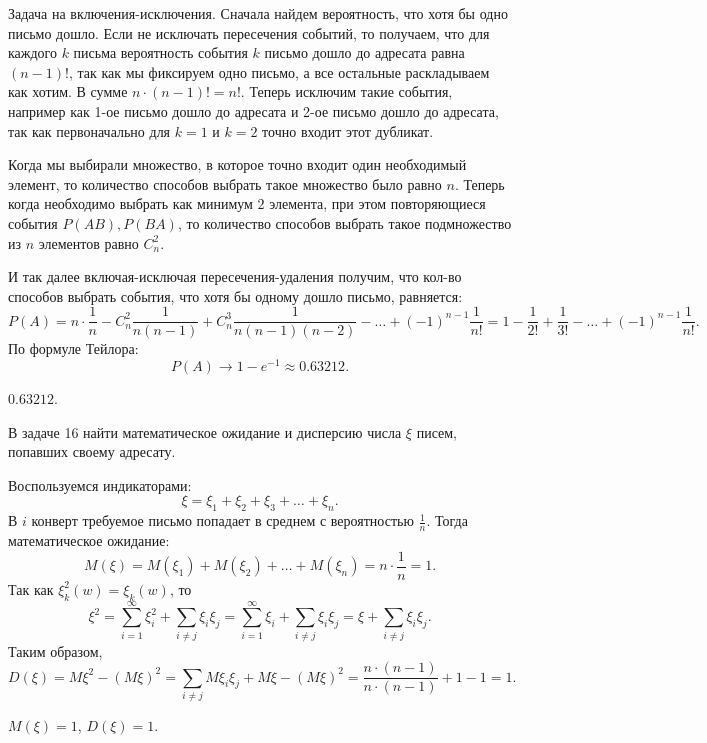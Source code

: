 \begin{solution}
Задача на включения-исключения. Сначала найдем вероятность, что хотя бы одно письмо дошло. Если не
исключать пересечения событий, то получаем, что для каждого $k$ письма вероятность события $k$
письмо дошло до адресата равна $(n - 1)!$, так как мы фиксируем одно письмо, а все остальные
раскладываем как хотим. В сумме $n \cdot (n - 1)! = n!$. Теперь исключим такие события, например как
1-ое письмо дошло до адресата и 2-ое письмо дошло до адресата, так как первоначально для $k = 1$ и 
$k = 2$ точно входит этот дубликат.

Когда мы выбирали множество, в которое точно входит один необходимый элемент, то количество способов
выбрать такое множество было равно $n$. Теперь когда необходимо выбрать как минимум $2$ элемента,
при этом повторяющиеся события $P(AB), P(BA)$, то
количество способов выбрать такое подмножество из $n$ элементов равно $C_n^2$.

И так далее включая-исключая пересечения-удаления получим, что кол-во способов выбрать события, что
хотя бы одному дошло письмо, равняется: 
\[
P(A) = n \cdot \frac{1}{n} - C_n^2 \frac{1}{n(n-1)} + C_n^3 \frac{1}{n(n - 1)(n -2)} - \dots +
(-1)^{n - 1} \frac{1}{n!} = 1 - \frac{1}{2!} + \frac{1}{3!} - \dots + (-1)^{n - 1}\frac{1}{n!} 
.\] 
По формуле Тейлора:
\[
  P(A) \to  1 - e^{-1} \approx 0.63212
.\] 
\end{solution}

\begin{result}
$0.63212 $.
\end{result}


\medskip
\begin{task}{17}
В задаче 16 найти математическое ожидание и дисперсию числа $\xi$ писем, попавших своему адресату.
\end{task}

\begin{solution}
Воспользуемся индикаторами: \[
\xi = \xi_1 + \xi_2 + \xi_3 + \dots + \xi_n
.\] 
В $i$ конверт требуемое письмо попадает в среднем с вероятностью $\frac{1}{n}$. Тогда математическое ожидание: \[
M(\xi) = M(\xi_1) + M(\xi_2) + \dots + M(\xi_n) = n \cdot \frac{1}{n} = 1 
.\] 
Так как $\xi_k^2(w) = \xi_k(w)$, то \[
\xi^2 = \sum_{i=1}^{\infty} \xi^2_i + \sum_{i \neq j} \xi_i \xi_j = \sum_{i = 1}^{\infty} \xi_i +
\sum_{i \neq j}\xi_i \xi_j = \xi + \sum_{i \neq  j}\xi_i \xi_j
.\] 
Таким образом, \[
  D(\xi) = M\xi^2 - (M\xi)^2 = \sum_{i \neq j} M \xi_i \xi_j + M \xi - (M\xi)^2 = \frac{n \cdot (n -
  1)}{n \cdot (n - 1)} + 1 - 1 = 1
.\] 
\end{solution}

\begin{result}
$M(\xi) = 1$, $D(\xi) = 1$.
\end{result}

